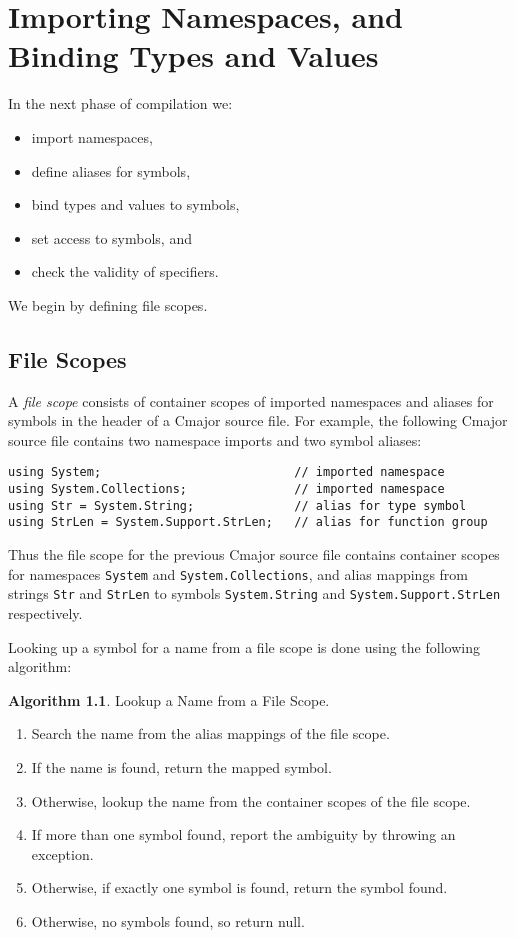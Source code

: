 \documentclass[a4paper,oneside,11pt]{book}
\theoremstyle{definition}
\newtheorem{algo}{Algorithm}[section]
\begin{document}
\chapter{Importing Namespaces, and Binding Types and Values}

In the next phase of compilation we:
\begin{itemize}
\item
import namespaces,
\item
define aliases for symbols,
\item
bind types and values to symbols,
\item
set access to symbols, and
\item
check the validity of specifiers.
\end{itemize}
We begin by defining file scopes.

\section{File Scopes}\label{filescope}

A \emph{file scope} consists of container scopes of imported namespaces and aliases for symbols in the header of a Cmajor source file.
For example, the following Cmajor source file contains two namespace imports and two symbol aliases:

\lstset{language=Cmajor}
\begin{lstlisting}
using System;                           // imported namespace
using System.Collections;               // imported namespace
using Str = System.String;              // alias for type symbol
using StrLen = System.Support.StrLen;   // alias for function group
\end{lstlisting}

Thus the file scope for the previous Cmajor source file contains container scopes for namespaces \verb|System| and \verb|System.Collections|, and
alias mappings from strings \verb|Str| and \verb|StrLen| to symbols \verb|System.String| and \verb|System.Support.StrLen| respectively.

Looking up a symbol for a name from a file scope is done using the following algorithm:

\begin{algo}\label{lookupfilescope} Lookup a Name from a File Scope.
\begin{enumerate}
\item
Search the name from the alias mappings of the file scope.
\item
If the name is found, return the mapped symbol.
\item
Otherwise, lookup the name from the container scopes of the file scope.
\item
If more than one symbol found, report the ambiguity by throwing an exception.
\item
Otherwise, if exactly one symbol is found, return the symbol found.
\item
Otherwise, no symbols found, so return null.
\end{enumerate}
\end{algo}
\end{document}
